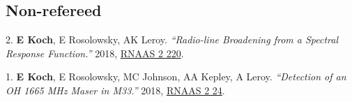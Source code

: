 \documentclass[letterpaper,11pt]{article}
\newenvironment{publist}{
  \begingroup
  \raggedright
  \begin{description}[leftmargin=4ex,style=sameline]
}{
  \end{description}
  \endgroup
}
\begin{document}
\subsection*{Non-refereed}

\begin{publist}
\item[2.] \textbf{E Koch}, E Rosolowsky, AK Leroy. \textit{``Radio-line Broadening from a Spectral Response Function.''} 2018, \href{http://adsabs.harvard.edu/abs/2018RNAAS...2d.220K}{RNAAS 2 220}.
\item[1.] \textbf{E Koch}, E Rosolowsky, MC Johnson, AA Kepley, A Leroy. \textit{``Detection of an OH 1665 MHz Maser in M33.''} 2018, \href{http://adsabs.harvard.edu/abs/2018RNAAS...2a..24K}{RNAAS 2 24}.
\end{publist}
\end{document}
